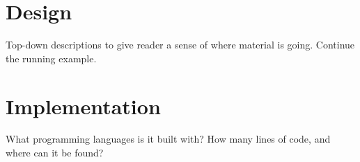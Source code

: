 \section{Design}\label{sec:design}
Top-down descriptions to give reader a sense of where material is going.
Continue the running example.

\section{Implementation}\label{sec:impl}
What programming languages is it built with?
How many lines of code, and where can it be found?